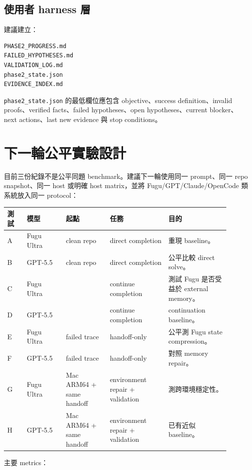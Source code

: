 \documentclass[UTF8,a4paper,11pt]{ctexart}
\newcommand{\artifact}[1]{\texttt{#1}}
\begin{document}
\subsection{使用者 harness 層}

建議建立：

\begin{Verbatim}[fontsize=\small]
PHASE2_PROGRESS.md
FAILED_HYPOTHESES.md
VALIDATION_LOG.md
phase2_state.json
EVIDENCE_INDEX.md
\end{Verbatim}

\artifact{phase2\_state.json} 的最低欄位應包含 objective、success definition、invalid proofs、verified facts、failed hypotheses、open hypotheses、current blocker、next actions、last new evidence 與 stop conditions。

\section{下一輪公平實驗設計}

目前三份紀錄不是公平同題 benchmark。建議下一輪使用同一 prompt、同一 repo snapshot、同一 host 或明確 host matrix，並將 Fugu/GPT/Claude/OpenCode 類系統放入同一 protocol：

\begin{longtable}{L{0.08\linewidth} L{0.16\linewidth} L{0.18\linewidth} L{0.24\linewidth} L{0.25\linewidth}}
\toprule
測試 & 模型 & 起點 & 任務 & 目的\\
\midrule
A & Fugu Ultra & clean repo & direct completion & 重現 baseline。\\
B & GPT-5.5 & clean repo & direct completion & 公平比較 direct solve。\\
C & Fugu Ultra &  & continue completion & 測試 Fugu 是否受益於 external memory。\\
D & GPT-5.5 &  & continue completion & continuation baseline。\\
E & Fugu Ultra & failed trace & handoff-only & 公平測 Fugu state compression。\\
F & GPT-5.5 & failed trace & handoff-only & 對照 memory repair。\\
G & Fugu Ultra & Mac ARM64 + same handoff & environment repair + validation & 測跨環境穩定性。\\
H & GPT-5.5 & Mac ARM64 + same handoff & environment repair + validation & 已有近似 baseline。\\
\bottomrule
\end{longtable}

主要 metrics：
\end{document}
